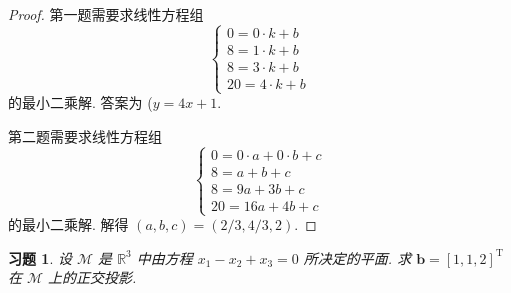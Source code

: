 \documentclass[UTF8]{ctexart}
\newtheorem{ex}[thm]{习题}
\begin{document}
\begin{proof}
  第一题需要求线性方程组
  \begin{equation*}
    \begin{cases}
      0 = 0 \cdot k + b \\
      8 = 1 \cdot k + b \\
      8 = 3 \cdot k + b \\
      20= 4\cdot k +b
    \end{cases}
  \end{equation*}
  的最小二乘解. 答案为 (\(y=4x+1\).

  第二题需要求线性方程组
  \begin{equation*}
    \begin{cases}
      0 = 0\cdot a +0\cdot b + c \\
      8 = a + b+c \\
      8= 9a+3b+c\\
      20 = 16a+4b+c
    \end{cases}
  \end{equation*}
  的最小二乘解. 解得 \((a,b,c) = (2/3, 4/3, 2)\).
\end{proof}

\begin{ex}
  设 \(\mathcal{M}\) 是 \(\mathbb{R}^{3}\) 中由方程
  \(x_1-x_2+x_3=0\) 所决定的平面. 求 \(\boldsymbol{b} = [1,1,2]^{\mathrm{T}}\)
  在 \(\mathcal{M}\) 上的正交投影.
\end{ex}
\end{document}
